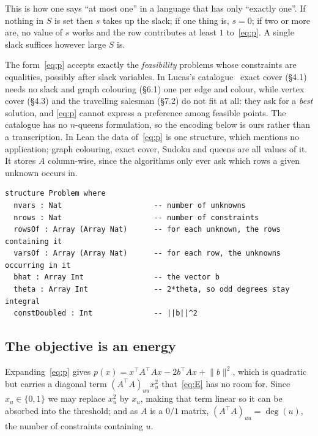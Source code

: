 \documentclass{easychair}
\newcommand{\citeref}[1]{\textcolor{academicpurple}{\cite{#1}}}
\begin{document}
This is how one says \enquote{at most one} in a language that has only \enquote{exactly one}. If
nothing in $S$ is set then $s$ takes up the slack; if one thing is, $s = 0$; if two or more are, no
value of $s$ works and the row contributes at least $1$ to~\eqref{eq:p}. A single slack suffices
however large $S$ is.

The form~\eqref{eq:p} accepts exactly the \emph{feasibility} problems whose constraints are
equalities, possibly after slack variables. In Lucas's catalogue~\citeref{lucas2014ising} exact cover
(\S4.1) needs no slack and graph colouring (\S6.1) one per edge and colour, while vertex cover (\S4.3)
and the travelling salesman (\S7.2) do not fit at all: they ask for a \emph{best} solution, and
\eqref{eq:p} cannot express a preference among feasible points. The catalogue has no $n$-queens
formulation, so the encoding below is ours rather than a transcription. In Lean the data of~\eqref{eq:p} is one structure, which mentions no
application; graph colouring, exact cover, Sudoku and queens are all values of it. It stores $A$
column-wise, since the algorithms only ever ask which rows a given unknown occurs in.

\begin{lstlisting}[caption={The canonical form. Field docstrings omitted.},label={lst:problem}]
structure Problem where
  nvars : Nat                     -- number of unknowns
  nrows : Nat                     -- number of constraints
  rowsOf : Array (Array Nat)      -- for each unknown, the rows containing it
  varsOf : Array (Array Nat)      -- for each row, the unknowns occurring in it
  bhat : Array Int                -- the vector b
  theta : Array Int               -- 2*theta, so odd degrees stay integral
  constDoubled : Int              -- ||b||^2
\end{lstlisting}

\subsection{The objective is an energy}\label{sec:net}

Expanding~\eqref{eq:p} gives $p(x) = x^{\top}\!A^{\top}\!Ax - 2b^{\top}\!Ax + \lVert b\rVert^2$, which
is quadratic but carries a diagonal term $(A^{\top}\!A)_{uu}x_u^2$ that~\eqref{eq:E} has no room for.
Since $x_u \in \{0,1\}$ we may replace $x_u^2$ by $x_u$, making that term linear so it can be absorbed
into the threshold; and as $A$ is a $0/1$ matrix, $(A^{\top}\!A)_{uu} = \deg(u)$, the number of
constraints containing $u$.
\end{document}
